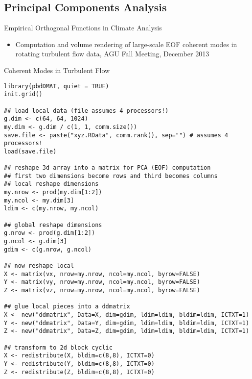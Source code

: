 \subsection{Principal Components Analysis}
\makesubcontentsslidessec


\begin{frame}
\begin{block}{Empirical Orthogonal Functions in Climate Analysis}
\begin{itemize}
\item Computation and volume rendering of large-scale EOF coherent
  modes in rotating turbulent flow data, AGU Fall Meeting, December 2013
\end{itemize}
\end{block}
\end{frame}

\begin{frame}
  \begin{exampleblock}{Coherent Modes in Turbulent Flow}\pause
\begin{lstlisting}[title=Get and Redistribute the Data]
library(pbdDMAT, quiet = TRUE)
init.grid()

## load local data (file assumes 4 processors!)
g.dim <- c(64, 64, 1024)
my.dim <- g.dim / c(1, 1, comm.size())
save.file <- paste("xyz.RData", comm.rank(), sep="") # assumes 4 processors!
load(save.file)

## reshape 3d array into a matrix for PCA (EOF) computation
## first two dimensions become rows and third becomes columns
## local reshape dimensions
my.nrow <- prod(my.dim[1:2])
my.ncol <- my.dim[3]
ldim <- c(my.nrow, my.ncol)

## global reshape dimensions
g.nrow <- prod(g.dim[1:2])
g.ncol <- g.dim[3]
gdim <- c(g.nrow, g.ncol)

## now reshape local
X <- matrix(vx, nrow=my.nrow, ncol=my.ncol, byrow=FALSE)
Y <- matrix(vy, nrow=my.nrow, ncol=my.ncol, byrow=FALSE)
Z <- matrix(vz, nrow=my.nrow, ncol=my.ncol, byrow=FALSE)

## glue local pieces into a ddmatrix
X <- new("ddmatrix", Data=X, dim=gdim, ldim=ldim, bldim=ldim, ICTXT=1)
Y <- new("ddmatrix", Data=Y, dim=gdim, ldim=ldim, bldim=ldim, ICTXT=1)
Z <- new("ddmatrix", Data=Z, dim=gdim, ldim=ldim, bldim=ldim, ICTXT=1)

## transform to 2d block cyclic
X <- redistribute(X, bldim=c(8,8), ICTXT=0)
Y <- redistribute(Y, bldim=c(8,8), ICTXT=0)
Z <- redistribute(Z, bldim=c(8,8), ICTXT=0)
\end{lstlisting}
  \end{exampleblock}
\end{frame}

